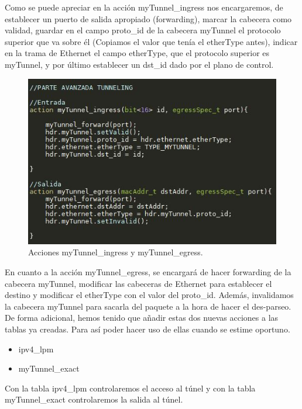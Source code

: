 Como se puede apreciar en la acción myTunnel\_ingress nos encargaremos, de establecer un puerto de salida apropiado (forwarding), marcar la cabecera como validad, guardar en el campo proto\_id de la cabecera myTunnel el protocolo superior que va sobre él (Copiamos el valor que tenía el etherType antes), indicar en la trama de Ethernet el campo etherType, que el protocolo superior es myTunnel, y por último establecer un dst\_id dado por el plano de control.
\begin{figure}[!htb]
  \centering
    \includegraphics[width=0.8\linewidth]{./img/test/13.JPG}
    \caption{Acciones myTunnel\_ingress y myTunnel\_egress.}
  \label{fig:yo}
\end{figure}
\newline
En cuanto a la acción myTunnel\_egress, se encargará de hacer forwarding de la cabecera myTunnel, modificar las cabeceras de Ethernet para establecer el destino y modificar el etherType con el valor del proto\_id. Además, invalidamos la cabecera myTunnel para sacarla del paquete a la hora de hacer el des-parseo.\newline
\newline
De forma adicional, hemos tenido que añadir estas dos nuevas acciones a las tablas ya creadas. Para así poder hacer uso de ellas cuando se estime oportuno.
\begin{itemize}
    \item  ipv4\_lpm
    \item  myTunnel\_exact
\end{itemize}
Con la tabla ipv4\_lpm controlaremos el acceso al túnel y con la tabla myTunnel\_exact controlaremos la salida al túnel.
\newpage

